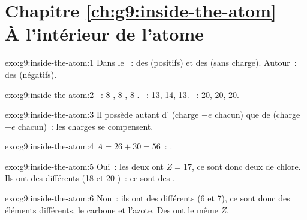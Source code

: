 \section*{Chapitre \ref{ch:g9:inside-the-atom} --- À l'intérieur de l'atome}

\begin{solution}{exo:g9:inside-the-atom:1}
Dans le ~: des  (positifs) et des  (sans charge).
Autour~: des  (négatifs).
\end{solution}

\begin{solution}{exo:g9:inside-the-atom:2}
~: 8 , 8 , 8 .
~: 13, 14, 13. ~: 20, 20, 20.
\end{solution}

\begin{solution}{exo:g9:inside-the-atom:3}
Il possède autant d' (charge $-e$ chacun) que de 
(charge $+e$ chacun)~: les charges se compensent.
\end{solution}

\begin{solution}{exo:g9:inside-the-atom:4}
$A = 26 + 30 = 56$~: .
\end{solution}

\begin{solution}{exo:g9:inside-the-atom:5}
Oui~: les deux ont $Z = 17$, ce sont donc deux  de chlore. Ils ont
des  différents (18 et 20 )~: ce sont des
.
\end{solution}

\begin{solution}{exo:g9:inside-the-atom:6}
Non~: ils ont des  différents (6 et 7), ce sont donc
des éléments différents, le carbone et l'azote. Des  ont le même
$Z$.
\end{solution}

